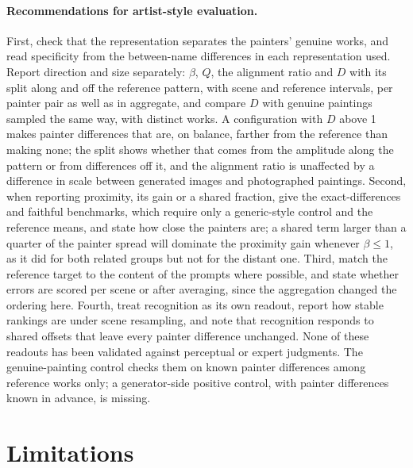 \documentclass[10pt]{article}
\begin{document}
\paragraph{Recommendations for artist-style evaluation.}
First, check that the representation separates the painters' genuine works, and read specificity
from the between-name differences in each representation used. Report direction and size
separately: $\beta$, $Q$, the alignment ratio and $D$ with its split along and off the reference
pattern, with scene and reference intervals, per painter pair as well as in aggregate, and compare
$D$ with genuine paintings sampled the same way, with distinct works. A configuration with $D$ above
1 makes painter differences that are, on balance, farther from the reference than making none; the
split shows whether that comes from the amplitude along the pattern or from differences off it, and
the alignment ratio is unaffected by a difference in scale between generated images and
photographed paintings. Second, when reporting proximity, its gain or a shared fraction, give the
exact-differences and faithful benchmarks, which require only a generic-style control and the
reference means, and state how close the painters are; a shared term larger than a quarter of the
painter spread will dominate the proximity gain whenever $\beta\le1$, as it did for both related
groups but not for the distant one. Third, match the
reference target to the content of the prompts where possible, and state whether errors are scored
per scene or after averaging, since the aggregation changed the ordering here. Fourth, treat
recognition as its own readout, report how stable rankings are under scene resampling, and note
that recognition responds to shared offsets that leave every painter difference unchanged. None of
these readouts has been validated against perceptual or expert judgments. The genuine-painting
control checks them on known painter differences among reference works only; a generator-side
positive control, with painter differences known in advance, is missing.

\section{Limitations}\label{sec:limitations}
\end{document}
